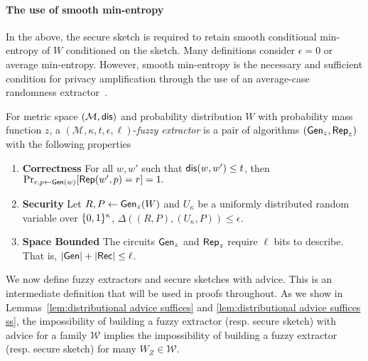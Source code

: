 \paragraph{The use of smooth min-entropy} In the above, the secure sketch is required to retain smooth conditional min-entropy of $W$ conditioned on the sketch.  Many definitions consider $\epsilon=0$ or average min-entropy.  However, smooth min-entropy is the necessary and sufficient condition for privacy amplification through the use of an average-case randomness extractor~\cite{renner2005simple}.

\begin{definition}
For metric space $(\mathcal{M}, \mathsf{dis})$ and probability distribution $W$ with probability mass function $z$, a $(\mathcal{M}, \kappa, t, \epsilon, \ell)$-\emph{fuzzy extractor} is a pair of algorithms $({\mathsf{Gen}}_z, {\mathsf{Rep}}_z)$ with the following properties 
\begin{enumerate} 
\itemsep0em
\item \textbf{Correctness} For all $w, w'$ such that $\mathsf{dis}(w, w')\le t$, then 
$\Pr_{r, p \leftarrow {\ensuremath{\mathsf{Gen}}}(w)}[{\mathsf{Rep}}(w', p) = r]=1.$ 
\item \textbf{Security} Let $R, P \leftarrow {\ensuremath{\mathsf{Gen}}}_z(W)$ and $U_\kappa$ be a uniformly distributed random variable over $\{0, 1\}^\kappa$, $\Delta((R, P), (U_\kappa, P))\le \epsilon.$
\item  \textbf{Space Bounded} The circuits ${\mathsf{Gen}}_z$ and ${\mathsf{Rep}}_z$ require $\ell$ bits to describe.  That is, $|{\mathsf{Gen}}| +|{\mathsf{Rec}}|\le \ell$.
\end{enumerate}
\label{def:fe}
\end{definition}

\noindent
We now define fuzzy extractors and secure sketches with advice.  This is an intermediate definition that will be used in proofs throughout.  As we show in Lemmas~\ref{lem:distributional advice suffices} and \ref{lem:distributional advice suffices ss}, the impossibility of building a fuzzy extractor (resp. secure sketch) with advice for a family $\mathcal{W}$ implies the impossibility of building a fuzzy extractor (resp. secure sketch) for many $W_Z\in\mathcal{W}$.

